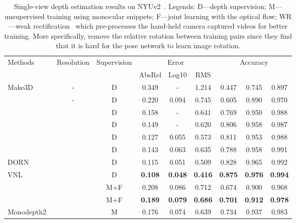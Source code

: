 \documentclass[twocolumn]{svjour3}
\renewcommand{\cite}[1]{\textcolor{blue}{\citep{#1}}}
\begin{document}
\begin{table*}[t]
\centering
    \caption{Single-view depth estimation results on NYUv2~\cite{silberman2012indoor}. Legends: D---depth supervision; M---unsupervised training using monocular snippets; F---joint learning with the optical flow;  WR---weak rectification~\cite{bian2020unsupervised} which pre-processes the hand-held camera captured videos for better training. More specifically, \cite{bian2020unsupervised} remove the relative rotation between training pairs since they find that it is hard for the pose network to learn image rotation.
    }
    \label{tab:nyu}
     \setlength{\tabcolsep}{2mm}
    \begin{tabular}{l c c | c c c  | c c c}
     \hline
     \multirow{2}{*}{Methods} & \multirow{2}{*}{Resolution} & \multirow{2}{*}{Supervision} & \multicolumn{3}{c|}{Error } & \multicolumn{3}{c}{Accuracy }  \\
     \cline{4-9}
      & & & AbsRel & Log10 & RMS  &  &  &  \\
     \hline
     Make3D~\cite{saxena2006learning} & - & D &  0.349 & - & 1.214 & 0.447 & 0.745 & 0.897 \\
\cite{wang2015towards} & - & D & 0.220 & 0.094 & 0.745 & 0.605 & 0.890 & 0.970 \\
     \cite{eigen2015predicting} &  & D & 0.158 & - & 0.641 & 0.769 & 0.950 & 0.988 \\
     \cite{chakrabarti2016depth} &  & D & 0.149 & - & 0.620 & 0.806 & 0.958 & 0.987 \\
     \cite{laina2016deeper} &  & D & 0.127 & 0.055 & 0.573 & 0.811 & 0.953 & 0.988 \\
     \cite{li2017two} &   & D & 0.143 & 0.063 & 0.635 & 0.788 & 0.958 & 0.991 \\
     DORN~\cite{fu2018deep} &  & D & 0.115 & 0.051 & 0.509 & 0.828 & 0.965 & 0.992 \\
     VNL~\cite{Yin2019enforcing} &  & D & \textbf{0.108} & \textbf{0.048} & \textbf{0.416} & \textbf{0.875} & \textbf{0.976} & \textbf{0.994} \\
     \hline
     \cite{Zhou_2019_ICCV} &  & M+F & 0.208 & 0.086 & 0.712 & 0.674 & 0.900 & 0.968 \\
     \cite{zhao2020towards} &  & M+F & \textbf{0.189} & \textbf{0.079} & \textbf{0.686} & \textbf{0.701} & \textbf{0.912} & \textbf{0.978} \\
     \hline
     Monodepth2~\cite{monodepth2} &  & M & 0.176  &   0.074  &   0.639  &   0.734  &   0.937  &   0.983 \\ 

\end{tabular}
\end{table*}
\end{document}
